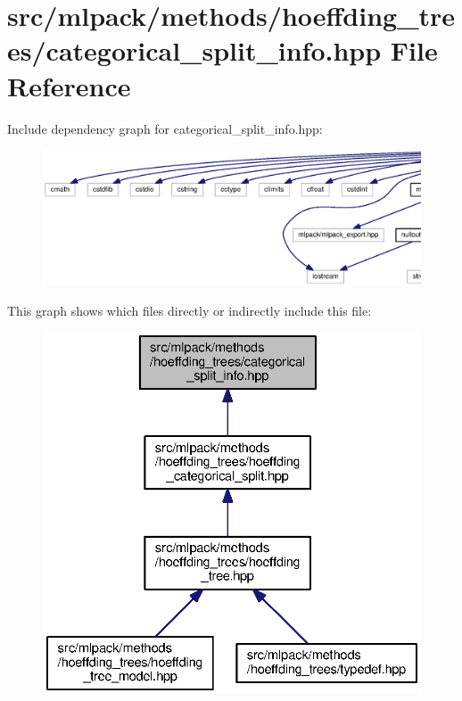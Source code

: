 \section{src/mlpack/methods/hoeffding\+\_\+trees/categorical\+\_\+split\+\_\+info.hpp File Reference}
\label{categorical__split__info_8hpp}
Include dependency graph for categorical\+\_\+split\+\_\+info.\+hpp\+:
\nopagebreak
\begin{figure}[H]
\begin{center}
\leavevmode
\includegraphics[width=350pt]{categorical__split__info_8hpp__incl}
\end{center}
\end{figure}
This graph shows which files directly or indirectly include this file\+:
\nopagebreak
\begin{figure}[H]
\begin{center}
\leavevmode
\includegraphics[width=332pt]{categorical__split__info_8hpp__dep__incl}
\end{center}
\end{figure}
